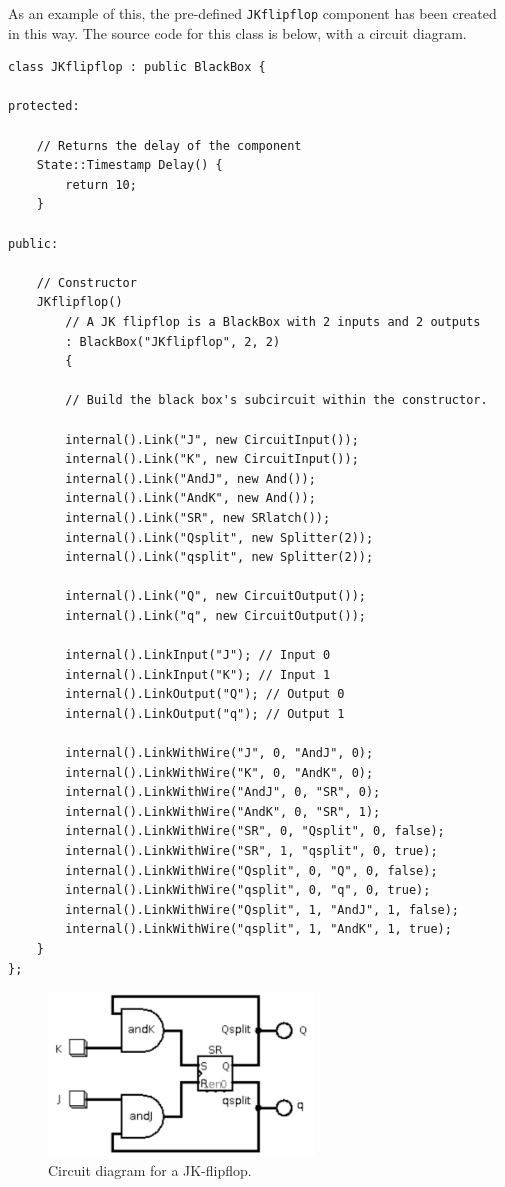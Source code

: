 \documentclass{article}
\newcommand{\ClassName}[1]{\texttt{#1}}
\begin{document}
As an example of this, the pre-defined \ClassName{JKflipflop} component has been created in this way. The source code for this class is below, with a circuit diagram.

\begin{lstlisting}
class JKflipflop : public BlackBox {

protected:

    // Returns the delay of the component
    State::Timestamp Delay() {
        return 10;
    }

public:

    // Constructor
    JKflipflop()
        // A JK flipflop is a BlackBox with 2 inputs and 2 outputs
        : BlackBox("JKflipflop", 2, 2)
        {

        // Build the black box's subcircuit within the constructor.

        internal().Link("J", new CircuitInput());
        internal().Link("K", new CircuitInput());
        internal().Link("AndJ", new And());
        internal().Link("AndK", new And());
        internal().Link("SR", new SRlatch());
        internal().Link("Qsplit", new Splitter(2));
        internal().Link("qsplit", new Splitter(2));

        internal().Link("Q", new CircuitOutput());
        internal().Link("q", new CircuitOutput());

        internal().LinkInput("J"); // Input 0
        internal().LinkInput("K"); // Input 1
        internal().LinkOutput("Q"); // Output 0
        internal().LinkOutput("q"); // Output 1

        internal().LinkWithWire("J", 0, "AndJ", 0);
        internal().LinkWithWire("K", 0, "AndK", 0);
        internal().LinkWithWire("AndJ", 0, "SR", 0);
        internal().LinkWithWire("AndK", 0, "SR", 1);
        internal().LinkWithWire("SR", 0, "Qsplit", 0, false);
        internal().LinkWithWire("SR", 1, "qsplit", 0, true);
        internal().LinkWithWire("Qsplit", 0, "Q", 0, false);
        internal().LinkWithWire("qsplit", 0, "q", 0, true);
        internal().LinkWithWire("Qsplit", 1, "AndJ", 1, false);
        internal().LinkWithWire("qsplit", 1, "AndK", 1, true);
    }
};
\end{lstlisting}

\begin{figure}[H]
    \begin{center}
        \includegraphics[width=200pt]{imgs/JK.pdf}
    \end{center}
    \caption{Circuit diagram for a JK-flipflop.}
\end{figure}
\end{document}
